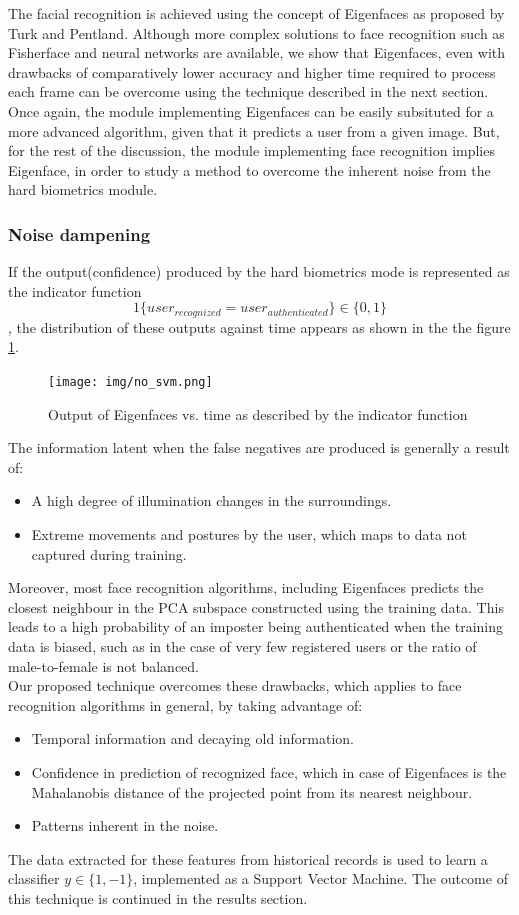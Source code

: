 \documentclass[12pt]{article}			%
\begin{document}
The facial recognition is achieved using the concept of Eigenfaces\cite{Turk91} as proposed by Turk and Pentland.
Although more complex solutions to face recognition such as Fisherface and neural networks are available, we show that Eigenfaces, even with drawbacks of comparatively lower accuracy and higher time required to process each frame can be overcome using the technique described in the next section.
Once again, the module implementing Eigenfaces can be easily subsituted for a more advanced algorithm, given that it predicts a user from a given image.
But, for the rest of the discussion, the module implementing face recognition implies Eigenface, in order to study a method to overcome the inherent noise from the hard biometrics module.

\subsubsection{Noise dampening}
If the output(confidence) produced by the hard biometrics mode is represented as the indicator function
$$ 1\{user_{recognized} = user_{authenticated}\} \in \{0,1\}$$,
the distribution of these outputs against time appears as shown in the the figure \ref{fig:no_svm}.
\begin{figure}[h!]
	\centering
	\texttt{[image: img/no\_svm.png]}
	\caption{Output of Eigenfaces vs. time as described by the indicator function}
	\label{fig:no_svm}
\end{figure}
The information latent when the false negatives are produced is generally a result of:
\begin{itemize}
	\item A high degree of illumination changes in the surroundings.
	\item Extreme movements and postures by the user, which maps to data not captured during training.
\end{itemize}
Moreover, most face recognition algorithms, including Eigenfaces predicts the closest neighbour in the PCA subspace constructed using the training data.
This leads to a high probability of an imposter being authenticated when the training data is biased, such as in the case of very few registered users or the ratio of male-to-female is not balanced.\\
Our proposed technique overcomes these drawbacks, which applies to face recognition algorithms in general, by taking advantage of:
\begin{itemize}
	\item Temporal information and decaying old information.
	\item Confidence in prediction of recognized face, which in case of Eigenfaces is the Mahalanobis distance of the projected point from its nearest neighbour.
	\item Patterns inherent in the noise.
\end{itemize}
The data extracted for these features from historical records is used to learn a classifier $y \in \{1,-1\}$, implemented as a Support Vector Machine. The outcome of this technique is continued in the results section.
\end{document}
